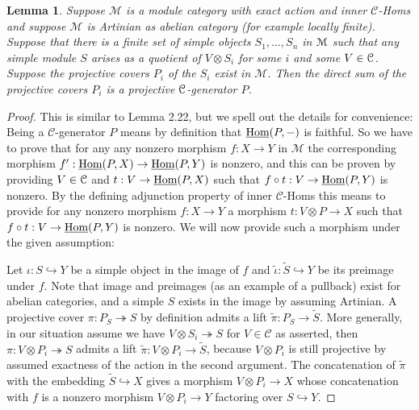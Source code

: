 \documentclass[a4paper, reqno]{amsart}
\newtheorem{lemma}[theorem]{Lemma}
\theoremstyle{introTheorems}
\newcommand\cC{\mathcal{C}}
\newcommand\cM{\mathcal{M}}
\newcommand\Hom{\textup{Hom}}
\renewcommand{\1}{\mathbbold{1}}
\begin{document}
\begin{lemma}\label{lm_finiteB}
Suppose $\cM$ is a module category with exact action and inner $\cC$-Homs and suppose  $\cM$  is Artinian as abelian category (for example locally finite).
Suppose that there is a finite set of simple objects $S_1,\ldots,S_n$ in $\mathcal{M}$ such that any simple module $S$ arises as a quotient of $V\otimes S_i$ for some $i$ and some $V\in \mathcal{C}$. Suppose the projective covers $P_i$ of the $S_i$ exist in $\cM$. Then the direct sum of the projective covers $P_i$ is a projective $\mathcal{C}$-generator $P$.   %


\end{lemma}
\begin{proof}
This is similar to \cite{DSPS19} Lemma 2.22, but we spell out the details for convenience:
Being a $\cC$-generator $P$ means by definition that $\underline{\Hom}(P,-)$ is faithful. So we have to prove that for any any nonzero morphism $f:X\to Y$ in $\cM$ the corresponding morphism $f':\underline{\Hom}(P,X)\to \underline{\Hom}(P,Y)$ is nonzero, and this can be proven by providing $V\in \mathcal{C}$ and $t:V\to \underline{\Hom}(P,X)$ such that $f\circ t:V\to \underline{\Hom}(P,Y)$ is nonzero. By the defining adjunction property of inner $\cC$-Homs this means to provide for any nonzero morphism $f:X\to Y$ a morphism $t:V\otimes P\to X$ such that $f\circ t:V\to \underline{\Hom}(P,Y)$ is nonzero. We will now provide such a morphism under the given assumption:

\bigskip


Let $\iota:S\hookrightarrow Y$ be a simple object in the image of $f$ and $\tilde{\iota}:\tilde{S}\hookrightarrow Y$ be its preimage under $f$. Note that image and preimages (as an example of a pullback) exist for abelian categories, and a simple $S$ exists in the image by assuming Artinian. A projective cover $\pi:P_S\twoheadrightarrow S$ by definition admits a lift $\tilde{\pi}: P_S\to \tilde{S}$. More generally, in our situation 
assume we have $V\otimes S_i\twoheadrightarrow S$ for $V\in \cC$ as asserted, then $\pi:V\otimes P_i\twoheadrightarrow S$ admits a lift $\tilde{\pi}:V\otimes P_i\to \tilde{S}$, because $V\otimes P_i$ is still projective by assumed exactness of the action in the second argument. The concatenation of $\tilde{\pi}$ with the embedding $\tilde{S}\hookrightarrow X$ gives a morphism $V\otimes P_i\to X$ whose concatenation with $f$ is a nonzero morphism $V\otimes P_i \to Y$ factoring over $S\hookrightarrow Y$. \qedhere

\end{proof}
\end{document}
